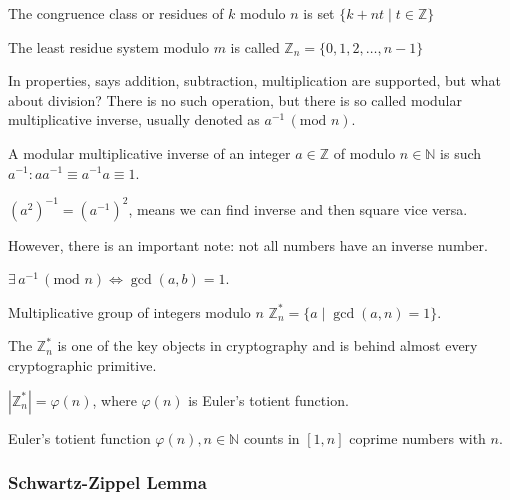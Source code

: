 \documentclass[../lecture-notes.tex]{subfiles}
\begin{document}
\begin{definition}
    The congruence class or residues of $k$ modulo $n$ is set $\{ k + nt \mid t \in \mathbb{Z}\}$    
\end{definition}

\begin{definition}
    The least residue system modulo $m$ is called $\mathbb{Z}_n = \{0, 1, 2, \dots, n-1\}$
\end{definition}

In properties, says addition, subtraction, multiplication are supported, but what about division? There is no such operation, but there is so called modular multiplicative inverse, usually denoted as $a^{-1} \, (\text{mod } n)$.

\begin{definition}
    A modular multiplicative inverse of an integer $a \in \mathbb{Z}$ of modulo $n \in \mathbb{N}$ is such $a^{-1}: aa^{-1} \equiv a^{-1}a \equiv 1$.
\end{definition}

\begin{remark}
    $(a^{2})^{-1} = (a^{-1})^{2}$, means we can find inverse and then square vice versa.
\end{remark}

However, there is an important note: not all numbers have an inverse number.

\begin{theorem}
    $\exists \, a^{-1} \, (\text{mod } n) \iff \gcd(a, b) = 1$.
\end{theorem}

\begin{definition}
    Multiplicative group of integers modulo $n$ $\mathbb{Z}_{n}^{*} = \{a \mid \gcd(a, n) = 1\}$.
\end{definition}

The $\mathbb{Z}_{n}^{*}$ is one of the key objects in cryptography and is behind almost every cryptographic primitive.

\begin{lemma}
    $|\mathbb{Z}_{n}^{*}| = \varphi(n)$, where $\varphi(n)$ is Euler's totient function.
\end{lemma}

\begin{definition}
    Euler's totient function $\varphi(n), n \in \mathbb{N}$ counts in $[1, n]$ coprime numbers with $n$. 
\end{definition}

\subsubsection{Schwartz-Zippel Lemma}
\end{document}
